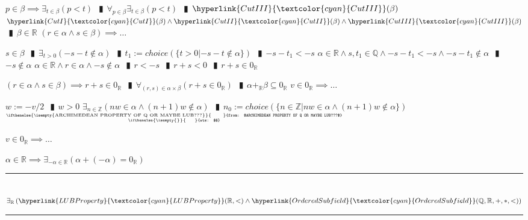\documentclass{book}
\newcommand{\wff}[1]{\hypertarget{#1}{\fbox{\textcolor{red}{$#1$}}\phantom{--}}}
\newcommand{\rf}[1]{\hyperlink{#1}{\textcolor{cyan}{#1}}}
\newcommand{\abr}{:=}
\newcommand{\pipe}{$\phantom{(}\vrectangleblack\phantom{)}$}
\newcommand{\pr}[1]{\left(#1\right)}
\newcommand{\ann}[2]{%
  \hfill %
  $\stackrel%
  {\hbox{\tiny{\ifthenelse{\isempty{#1}}%
    {\phantom{from}}%
    {from: $#1$}}}}%
  {\hbox{\tiny{\ifthenelse{\isempty{#2}}%
    {\phantom{wts}}%
    {wts: $#2$}}}}$%
\ }
\begin{document}
\begin{enumerate}
\begin{enumerate}
\begin{enumerate}
\begin{enumerate}
      \end{enumerate}
      \lit $p \in \beta \implies \exists_{t \in \beta}(p < t)$ \pipe $\forall_{p \in \beta} \exists_{t \in \beta}(p < t)$ \pipe $\rf{CutIII}(\beta)$
      \lit $\rf{CutI}(\beta) \land \rf{CutII}(\beta) \land \rf{CutIII}(\beta)$ \pipe $\beta \in \mathbb{R}$
      \lit $(r \in \alpha \land s \in \beta) \implies \ldots$
      \begin{enumerate}
        \lit $s \in \beta$ \pipe $\exists_{t > 0}(-s - t \notin \alpha)$ \pipe $t_1 \abr choice(\{t > 0 | -s - t \notin \alpha\})$ \pipe $-s - t_1 < -s$
        \lit $\alpha \in \mathbb{R} \land s, t_1 \in \mathbb{Q} \land -s - t_1 < -s \land -s - t_1 \notin \alpha$ \pipe $-s \notin \alpha$
        \lit $\alpha \in \mathbb{R} \land r \in \alpha \land -s \notin \alpha$ \pipe $r < -s$ \pipe $r + s < 0$ \pipe $r + s \in 0_{\mathbb{R}}$
      \end{enumerate}
      \lit $(r \in \alpha \land s \in \beta) \implies r + s \in 0_\mathbb{R}$ \pipe $\forall_{(r, s) \in \alpha \times \beta}(r + s \in 0_{\mathbb{R}})$ \pipe $\alpha +_{\mathbb{R}} \beta \subseteq 0_{\mathbb{R}}$
      \lit $v \in 0_{\mathbb{R}} \implies \ldots$
      \begin{enumerate}
        \lit $w \abr -v/2$ \pipe $w > 0$
        \lit $\exists_{n \in \mathbb{Z}}(n w \in \alpha \land (n + 1) w \notin \alpha)$ \pipe $n_0 \abr choice(\{n \in \mathbb{Z} | n w \in \alpha \land (n + 1) w \notin \alpha\})$    \ann{ARCHIMEDEAN PROPERTY OF Q OR MAYBE LUB???}{}
      \end{enumerate}
      \lit $v \in 0_{\mathbb{R}} \implies \ldots$
    \end{enumerate}
    \lit $\alpha \in \mathbb{R} \implies \exists_{-\alpha \in \mathbb{R}}\pr{\alpha + (-\alpha) = 0_{\mathbb{R}}}$
  \end{enumerate}
\end{enumerate} \vspace{.75mm} \hrule \vspace{.75mm} \ \\






\wff{ExistenceOfR} $\exists_{\mathbb{R}}\pr{\rf{LUBProperty}(\mathbb{R}, <) \land \rf{OrderedSubfield}(\mathbb{Q}, \mathbb{R}, +, *, <)}$
\begin{enumerate}
\end{enumerate} \vspace{.75mm} \hrule \vspace{.75mm} \ \\
\end{document}
